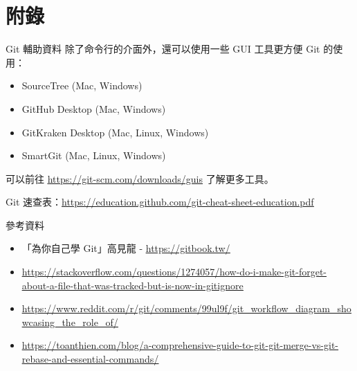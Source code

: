 \documentclass[xetex, unicode, 10pt, aspectratio=169]{beamer}
\begin{document}
\section{附錄}

\begin{frame}{Git 輔助資料}
    除了命令行的介面外，還可以使用一些 GUI 工具更方便 Git 的使用：
    \begin{itemize}
        \item SourceTree (Mac, Windows)
        \item GitHub Desktop (Mac, Windows)
        \item GitKraken Desktop (Mac, Linux, Windows)
        \item SmartGit (Mac, Linux, Windows)
    \end{itemize}

    可以前往
    \underline{\href{https://git-scm.com/downloads/guis}{https://git-scm.com/downloads/guis}}
    了解更多工具。

    Git
    速查表：\underline{\href{https://education.github.com/git-cheat-sheet-education.pdf}{https://education.github.com/git-cheat-sheet-education.pdf}}
\end{frame}

\begin{frame}{參考資料}
    \begin{itemize}
        \item 「為你自己學 Git」高見龍 -
            \href{https://gitbook.tw/}{\ul{https://gitbook.tw/}}
        \item
            \href{https://stackoverflow.com/questions/1274057/how-do-i-make-git-forget-about-a-file-that-was-tracked-but-is-now-in-gitignore}{\ul{https://stackoverflow.com/questions/1274057/how-do-i-make-git-forget-about-a-file-that-was-tracked-but-is-now-in-gitignore}}
        \item
            \href{https://www.reddit.com/r/git/comments/99ul9f/git_workflow_diagram_showcasing_the_role_of/}{\small
            \ul{https://www.reddit.com/r/git/comments/99ul9f/git\_workflow\_diagram\_showcasing\_the\_role\_of/}}
        \item
            \href{https://toanthien.com/blog/a-comprehensive-guide-to-git-git-merge-vs-git-rebase-and-essential-commands/}{\ul{https://toanthien.com/blog/a-comprehensive-guide-to-git-git-merge-vs-git-rebase-and-essential-commands/}}
    \end{itemize}
\end{frame}
\end{document}
